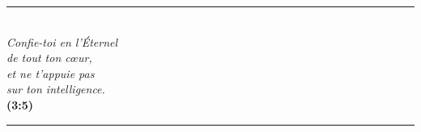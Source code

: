 \newpage
\mbox{}
\vfill

\newenvironment*{myverse}%
   {\begin{center}\rule{5cm}{1pt}\\[0.2cm]\doublespacing}%
   {\\[0.2cm]\rule{5cm}{1pt}\end{center}}


\begin{myverse}
{\itshape
Confie-toi en l'Éternel\\
 de tout ton cœur,\\
et ne t'appuie pas\\ sur ton intelligence.\\[5mm]
}
\myversereffont\bfseries\scshape {}(3:5)
\end{myverse}
\vfill
\mbox{}
\newpage

